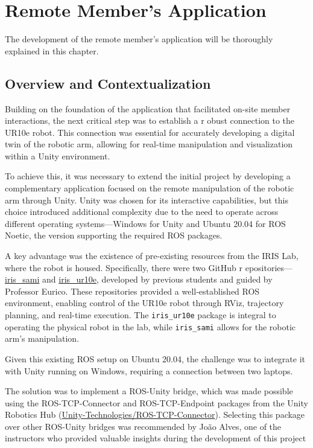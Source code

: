 \chapter{Remote Member's Application}
\label{chapter:remote}


\begin{introduction}
The development of the remote member's application will be thoroughly explained in this chapter.
\end{introduction}

\section{Overview and Contextualization}

    Building on the foundation of the application that facilitated on-site member interactions, the next critical step was to establish a r
    obust connection to the UR10e robot. This connection was essential for accurately developing a digital twin of the robotic arm, allowing 
    for real-time manipulation and visualization within a Unity environment.

    To achieve this, it was necessary to extend the initial project by developing a complementary application focused on the remote manipulation 
    of the robotic arm through Unity. Unity was chosen for its interactive capabilities, but this choice introduced additional complexity due to the 
    need to operate across different operating systems—Windows for Unity and Ubuntu 20.04 for ROS Noetic, the version supporting the required ROS packages.

    A key advantage was the existence of pre-existing resources from the IRIS Lab, where the robot is housed. Specifically, there were two GitHub r
    epositories—\href{https://github.com/iris-ua/iris_sami}{iris\_sami} and \href{https://github.com/iris-ua/iris_ur10e}{iris\_ur10e}, developed by 
    previous students and guided by Professor Eurico. These repositories provided a well-established ROS environment, enabling control of the UR10e 
    robot through RViz, trajectory planning, and real-time execution. The \texttt{iris\_ur10e} package is integral to operating the physical robot in 
    the lab, while \texttt{iris\_sami} allows for the robotic arm's manipulation.

    Given this existing ROS setup on Ubuntu 20.04, the challenge was to integrate it with Unity running on Windows, requiring a connection between two 
    laptops. 

    The solution was to implement a ROS-Unity bridge, which was made possible using the ROS-TCP-Connector and ROS-TCP-Endpoint packages from the 
    Unity Robotics Hub (\href{https://github.com/Unity-Technologies/ROS-TCP-Connector}{Unity-Technologies/ROS-TCP-Connector}). Selecting this package over 
    other ROS-Unity bridges was recommended by João Alves, one of the instructors who provided valuable insights during the development of this project


